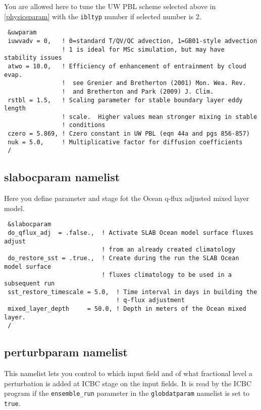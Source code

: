 You are allowed here to tune the UW PBL scheme selected above in
\ref{physicsparam} with the \verb=ibltyp= number if selected number is
$2$. 

{\footnotesize
\begin{Verbatim}
 &uwparam
 iuwvadv = 0,   ! 0=standard T/QV/QC advection, 1=GB01-style advection
                ! 1 is ideal for MSc simulation, but may have stability issues
 atwo = 10.0,   ! Efficiency of enhancement of entrainment by cloud evap.
                !  see Grenier and Bretherton (2001) Mon. Wea. Rev.
                !  and Bretherton and Park (2009) J. Clim.
 rstbl = 1.5,   ! Scaling parameter for stable boundary layer eddy length
                ! scale.  Higher values mean stronger mixing in stable 
                ! conditions
 czero = 5.869, ! Czero constant in UW PBL (eqn 44a and pgs 856-857)
 nuk = 5.0,     ! Multiplicative factor for diffusion coefficients
 /
\end{Verbatim}
}

\subsection{slabocparam namelist}

Here you define parameter and stage fot the Ocean q-flux adjusted mixed layer
model.

{\footnotesize
\begin{Verbatim}
 &slabocparam
 do_qflux_adj  = .false.,  ! Activate SLAB Ocean model surface fluxes adjust
                           ! from an already created climatology
 do_restore_sst = .true.,  ! Create during the run the SLAB Ocean model surface
                           ! fluxes climatology to be used in a subsequent run
 sst_restore_timescale = 5.0,  ! Time interval in days in building the
                               ! q-flux adjustment
 mixed_layer_depth     = 50.0, ! Depth in meters of the Ocean mixed layer.
 /
\end{Verbatim}
}

\subsection{perturbparam namelist}

This namelist lets you control to which input field and of what fractional
level a perturbation is added at ICBC stage on the input fields.
It is read by the ICBC program if the \verb=ensemble_run= parameter in the
\verb=globdatparam= namelist is set to \verb=true=.

